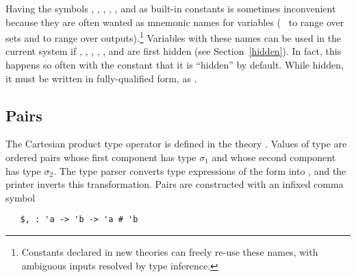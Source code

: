 Having the symbols , , , , , and 
as built-in constants  is sometimes inconvenient because
they are often wanted as mnemonic names for variables (\eg\  to
range over sets and  to range over outputs).\footnote{Constants
  declared in new theories can freely re-use these names, with
  ambiguous inputs resolved by type inference.}  Variables with these
names can be used in the current system if , , ,
, , and  are first hidden (see
Section~\ref{hidden}).  In fact, this happens so often with the
constant  that it is ``hidden'' by default.  While hidden,
it must be written in fully-qualified form, as .
%


\subsection{Pairs}\label{prod}

%
The Cartesian  product  type  operator
%
%
%
%
is defined in the theory . Values of type
 are ordered pairs whose first
component has type $\sigma_1$ and whose second component has type
$\sigma_2$.  The \HOL{} type parser
%
%
converts type expressions of the form 
%
%
into ,
%
%
and the printer inverts this transformation. Pairs
%
%
are constructed with an infixed comma symbol

\begin{hol}
\begin{verbatim}
   $, : 'a -> 'b -> 'a # 'b
\end{verbatim}
\end{hol}

